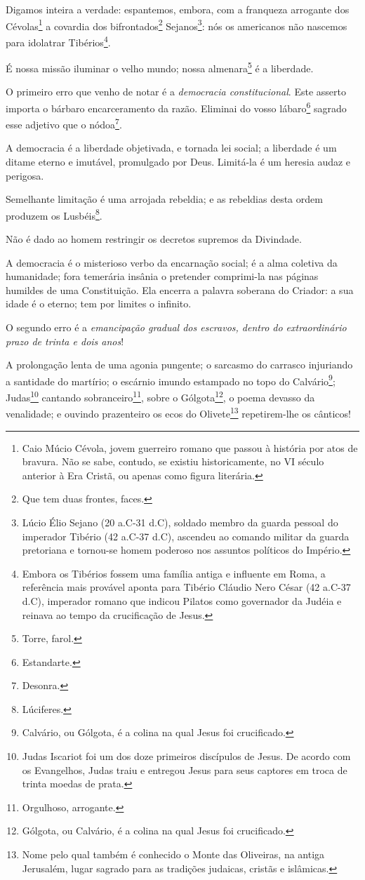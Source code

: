 Digamos inteira a verdade: espantemos, embora, com a franqueza arrogante
dos Cévolas\footnote{Caio Múcio Cévola, jovem guerreiro romano que
  passou à história por atos de bravura. Não se sabe, contudo, se
  existiu historicamente, no VI século anterior à Era Cristã, ou apenas
  como figura literária.} a covardia dos bifrontados\footnote{Que tem
  duas frontes, faces.} Sejanos\footnote{Lúcio Élio Sejano (20 a.C-31
  d.C), soldado membro da guarda pessoal do imperador Tibério (42 a.C-37
  d.C), ascendeu ao comando militar da guarda pretoriana e tornou-se
  homem poderoso nos assuntos políticos do Império.}: nós os americanos
não nascemos para idolatrar Tibérios\footnote{Embora os Tibérios
  fossem uma família antiga e influente em Roma, a referência mais
  provável aponta para Tibério Cláudio Nero César (42 a.C-37 d.C),
  imperador romano que indicou Pilatos como governador da Judéia e
  reinava ao tempo da crucificação de Jesus.}.

É nossa missão iluminar o velho mundo; nossa almenara\footnote{Torre,
  farol.} é a liberdade.

O primeiro erro que venho de notar é a \emph{democracia constitucional}.
Este asserto importa o bárbaro encarceramento da razão. Eliminai do
vosso lábaro\footnote{Estandarte.} sagrado esse adjetivo que o
nódoa\footnote{Desonra.}.

A democracia é a liberdade objetivada, e tornada lei social; a liberdade
é um ditame eterno e imutável, promulgado por Deus. Limitá-la é um
heresia audaz e perigosa.

Semelhante limitação é uma arrojada rebeldia; e as rebeldias desta ordem
produzem os Lusbéis\footnote{Lúciferes.}.

Não é dado ao homem restringir os decretos supremos da Divindade.

A democracia é o misterioso verbo da encarnação social; é a alma
coletiva da humanidade; fora temerária insânia o pretender comprimi-la
nas páginas humildes de uma Constituição. Ela encerra a palavra soberana
do Criador: a sua idade é o eterno; tem por limites o infinito.

O segundo erro é a \emph{emancipação gradual dos escravos, dentro do
extraordinário prazo de trinta e dois anos}!

A prolongação lenta de uma agonia pungente; o sarcasmo do carrasco
injuriando a santidade do martírio; o escárnio imundo estampado no topo
do Calvário\footnote{Calvário, ou Gólgota, é a colina na qual Jesus
  foi crucificado.}; Judas\footnote{Judas Iscariot foi um dos doze
  primeiros discípulos de Jesus. De acordo com os Evangelhos, Judas
  traiu e entregou Jesus para seus captores em troca de trinta moedas de
  prata.} cantando sobranceiro\footnote{Orgulhoso, arrogante.}, sobre
o Gólgota\footnote{Gólgota, ou Calvário, é a colina na qual Jesus foi
  crucificado.}, o poema devasso da venalidade; e ouvindo prazenteiro os
ecos do Olivete\footnote{Nome pelo qual também é conhecido o Monte das
  Oliveiras, na antiga Jerusalém, lugar sagrado para as tradições
  judaicas, cristãs e islâmicas.} repetirem-lhe os cânticos!

